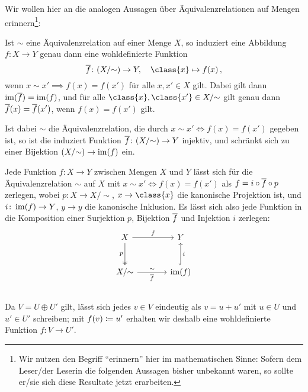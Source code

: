 \begin{remark}
  Wir wollen hier an die analogen Aussagen über Äquivalenzrelationen auf Mengen erinnern\footnote{
  Wir nutzen den Begriff \enquote{erinnern} hier im mathematischen Sinne:
  Sofern dem Leser/der Leserin die folgenden Aussagen bisher unbekannt waren, so sollte er/sie sich diese Resultate jetzt erarbeiten.}:
  
  Ist $\sim$ eine Äquivalenzrelation auf einer Menge $X$, so induziert eine Abbildung $f \colon X \to Y$ genau dann eine wohldefinierte Funktion
  \[
            \induced{f}
    \colon  (X/{\sim})
    \to     Y,
    \quad   \class{x}
    \mapsto f(x) \,,
  \]
  wenn $x \sim x' \implies f(x) = f(x')$ für alle $x, x' \in X$ gilt.
  Dabei gilt dann $\operatorname{im}(\overline{f}) = \operatorname{im}(f)$, und für alle $\class{x}, \class{x'} \in X/{\sim}$ gilt genau dann $\overline{f}(x) = \overline{f}(x')$, wenn $f(x) = f(x')$ gilt.
  
  Ist dabei $\sim$ die Äquivalenzrelation, die durch $x \sim x' \iff f(x) = f(x')$ gegeben ist, so ist die induziert Funktion $\overline{f} \colon (X/{\sim}) \to Y$ injektiv, und schränkt sich zu einer Bijektion $(X/{\sim}) \to \operatorname{im}(f)$ ein.
  
  Jede Funktion $f \colon X \to Y$ zwischen Mengen $X$ und $Y$ lässt sich für die Äquivalenzrelation $\sim$ auf $X$ mit $x \sim x' \iff f(x) = f(x')$ als $f = i \circ \overline{f} \circ p$ zerlegen, wobei $p \colon X \to X/{\sim}$, $x \to \class{x}$ die kanonische Projektion ist, und $i \colon \operatorname{im}(f) \to Y$, $y \to y$ die kanonische Inklusion.
  Es lässt sich also jede Funktion in die Komposition einer Surjektion $p$, Bijektion $\overline{f}$ und Injektion $i$ zerlegen:
  \[
    \begin{tikzcd}[sep = large]
        X
        \arrow{r}[above]{f}
        \arrow[twoheadrightarrow]{d}[left]{p}
      & Y
      \\
        X/{\sim}
        \arrow{r}[above]{\sim}[below]{\induced{f}}
      & \im(f)
        \arrow[hook]{u}[right]{i}
    \end{tikzcd}
  \]
\end{remark}





\subsection{}

Da $V = U \oplus U'$ gilt, lässt sich jedes $v \in V$ eindeutig als $v = u + u'$ mit $u \in U$ und $u' \in U'$ schreiben;
mit $f(v) \coloneqq u'$ erhalten wir deshalb eine wohldefinierte Funktion $f \colon V \to U'$.

